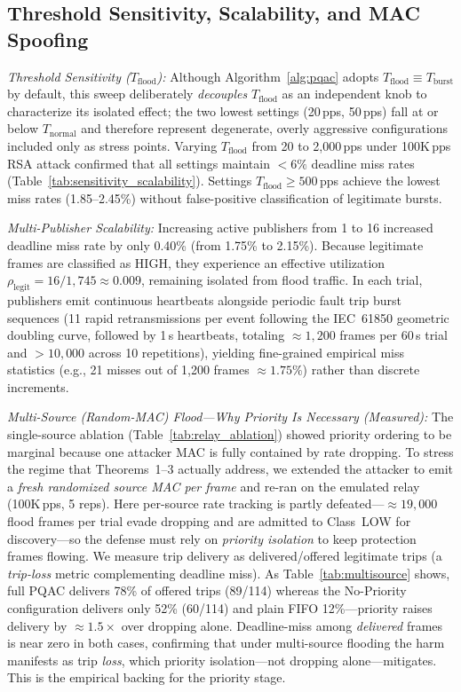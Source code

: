 \documentclass[journal]{IEEEtran}
\begin{document}
\subsection{Threshold Sensitivity, Scalability, and MAC Spoofing}
\label{sec:spoof_eval}
\textit{Threshold Sensitivity ($T_{\text{flood}}$):} Although Algorithm~\ref{alg:pqac} adopts $T_{\text{flood}} \equiv T_{\text{burst}}$ by default, this sweep deliberately \emph{decouples} $T_{\text{flood}}$ as an independent knob to characterize its isolated effect; the two lowest settings (20\,pps, 50\,pps) fall at or below $T_{\text{normal}}$ and therefore represent degenerate, overly aggressive configurations included only as stress points. Varying $T_{\text{flood}}$ from 20 to 2,000\,pps under 100K\,pps RSA attack confirmed that all settings maintain $<6\%$ deadline miss rates (Table~\ref{tab:sensitivity_scalability}). Settings $T_{\text{flood}} \ge 500$\,pps achieve the lowest miss rates (1.85--2.45\%) without false-positive classification of legitimate bursts.

\textit{Multi-Publisher Scalability:} Increasing active publishers from 1 to 16 increased deadline miss rate by only 0.40\% (from 1.75\% to 2.15\%). Because legitimate frames are classified as HIGH, they experience an effective utilization $\rho_{\text{legit}} = 16/1,745 \approx 0.009$, remaining isolated from flood traffic. In each trial, publishers emit continuous heartbeats alongside periodic fault trip burst sequences (11 rapid retransmissions per event following the IEC~61850 geometric doubling curve, followed by 1\,s heartbeats, totaling $\approx 1{,}200$ frames per 60\,s trial and $>10{,}000$ across 10 repetitions), yielding fine-grained empirical miss statistics (e.g., 21 misses out of 1,200 frames $\approx 1.75\%$) rather than discrete increments.

\textit{Multi-Source (Random-MAC) Flood---Why Priority Is Necessary (Measured):} The single-source ablation (Table~\ref{tab:relay_ablation}) showed priority ordering to be marginal because one attacker MAC is fully contained by rate dropping. To stress the regime that Theorems~1--3 actually address, we extended the attacker to emit a \emph{fresh randomized source MAC per frame} and re-ran on the emulated relay (100K\,pps, 5 reps). Here per-source rate tracking is partly defeated---$\approx 19{,}000$ flood frames per trial evade dropping and are admitted to Class~LOW for discovery---so the defense must rely on \emph{priority isolation} to keep protection frames flowing. We measure trip delivery as delivered/offered legitimate trips (a \emph{trip-loss} metric complementing deadline miss). As Table~\ref{tab:multisource} shows, full PQAC delivers 78\% of offered trips (89/114) whereas the No-Priority configuration delivers only 52\% (60/114) and plain FIFO 12\%---priority raises delivery by $\approx 1.5\times$ over dropping alone. Deadline-miss among \emph{delivered} frames is near zero in both cases, confirming that under multi-source flooding the harm manifests as trip \emph{loss}, which priority isolation---not dropping alone---mitigates. This is the empirical backing for the priority stage.
\end{document}
